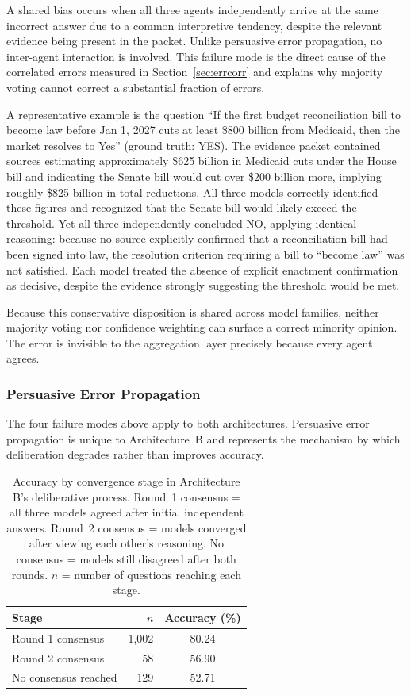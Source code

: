 A shared bias occurs when all three agents independently arrive at the same incorrect answer due to a common interpretive tendency, despite the relevant evidence being present in the packet. Unlike persuasive error propagation, no inter-agent interaction is involved. This failure mode is the direct cause of the correlated errors measured in Section~\ref{sec:errcorr} and explains why majority voting cannot correct a substantial fraction of errors.

A representative example is the question ``If the first budget reconciliation bill to become law before Jan 1, 2027 cuts at least \$800 billion from Medicaid, then the market resolves to Yes'' (ground truth: YES). The evidence packet contained sources estimating approximately \$625 billion in Medicaid cuts under the House bill and indicating the Senate bill would cut over \$200 billion more, implying roughly \$825 billion in total reductions. All three models correctly identified these figures and recognized that the Senate bill would likely exceed the threshold. Yet all three independently concluded NO, applying identical reasoning: because no source explicitly confirmed that a reconciliation bill had been signed into law, the resolution criterion requiring a bill to ``become law'' was not satisfied. Each model treated the absence of explicit enactment confirmation as decisive, despite the evidence strongly suggesting the threshold would be met.

Because this conservative disposition is shared across model families, neither majority voting nor confidence weighting can surface a correct minority opinion. The error is invisible to the aggregation layer precisely because every agent agrees.


\subsubsection{Persuasive Error Propagation}
\label{sec:failmode-pep}

The four failure modes above apply to both architectures. Persuasive error propagation is unique to Architecture~B and represents the mechanism by which deliberation degrades rather than improves accuracy.

\begin{table}[t]
\centering
\caption{Accuracy by convergence stage in Architecture B's deliberative process. Round~1 consensus = all three models agreed after initial independent answers. Round~2 consensus = models converged after viewing each other's reasoning. No consensus = models still disagreed after both rounds. $n$ = number of questions reaching each stage.}
\label{tab:convergence}
\begin{tabular}{lrc}
\toprule
\textbf{Stage} & $n$ & \textbf{Accuracy (\%)} \\
\midrule
Round 1 consensus     & 1,002 & 80.24 \\
Round 2 consensus     &    58 & 56.90 \\
No consensus reached  &   129 & 52.71 \\
\bottomrule
\end{tabular}
\end{table}

